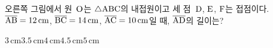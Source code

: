 \noindent\begin{minipage}[t]{0.58\linewidth}\vspace{0pt}\raggedright 오른쪽 그림에서 원~$\mathrm{O}$는 $\triangle\mathrm{ABC}$의 내접원이고 세 점~$\mathrm{D}$, $\mathrm{E}$, $\mathrm{F}$는 접점이다. $\overline{\mathrm{AB}}=12\,\mathrm{cm}$, $\overline{\mathrm{BC}}=14\,\mathrm{cm}$, $\overline{\mathrm{AC}}=10\,\mathrm{cm}$일 때, $\overline{\mathrm{AD}}$의 길이는?\end{minipage}\hfill\begin{minipage}[t]{0.4\linewidth}\vspace{0pt}\centering \resizebox{\ifdim\width>\linewidth\linewidth\else\width\fi}{!}{}\end{minipage}\par
\begin{choices32}{$3\,\mathrm{cm}$}{$3.5\,\mathrm{cm}$}{$4\,\mathrm{cm}$}{$4.5\,\mathrm{cm}$}{$5\,\mathrm{cm}$}\end{choices32}
